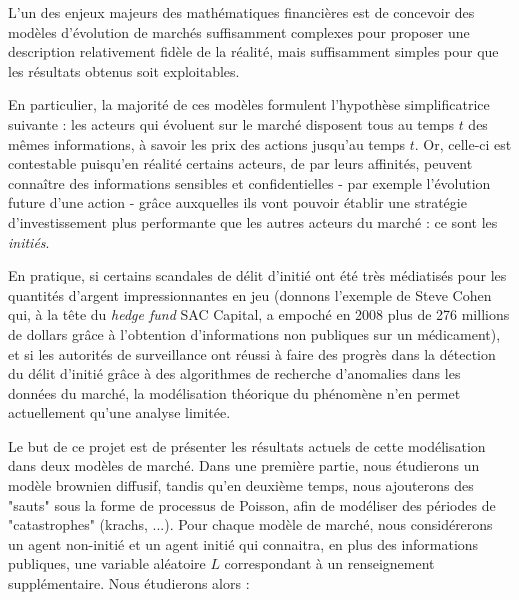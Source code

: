 \documentclass[../finalreport.tex]{subfiles}
\begin{document}
\par L'un des enjeux majeurs des mathématiques financières est de concevoir des modèles d'évolu\-tion de marchés suffisamment complexes pour proposer une description relativement fidèle de la réalité, mais suffisamment simples pour que les résultats obtenus soit exploitables.

\vspace{5mm}

\par En particulier, la majorité de ces modèles formulent l'hypothèse simplificatrice suivante : les acteurs qui évoluent sur le marché disposent tous au temps $t$ des mêmes informations, à savoir les prix des actions jusqu'au temps $t$. Or, celle-ci est contestable puisqu'en réalité certains acteurs, de par leurs affinités, peuvent connaître des informations sensibles et confidentielles - par exemple l'évolution future d'une action - grâce auxquelles ils vont pouvoir établir une stratégie d'investissement plus performante que les autres acteurs du marché : ce sont les \emph{initiés}. 

\vspace{5mm}

\par En pratique, si certains scandales de délit d'initié ont été très médiatisés pour les quantités d'argent impressionnantes en jeu (donnons l'exemple de Steve Cohen qui, à la tête du \emph{hedge fund} SAC Capital, a empoché en 2008 plus de 276 millions de dollars grâce à l'obtention d'informations non publiques sur un médicament), et si les autorités de surveillance ont réussi à faire des progrès dans la détection du délit d'initié grâce à des algorithmes de recherche d'anomalies dans les données du marché, la modélisation théorique du phénomène n'en permet actuellement qu'une analyse limitée.

\vspace{5mm}

\par Le but de ce projet est de présenter les résultats actuels de cette modélisation dans deux modèles de marché. Dans une première partie, nous étudierons un modèle brownien diffusif, tandis qu'en deuxième temps, nous ajouterons des "sauts" sous la forme de processus de Poisson, afin de modéliser des périodes de "catastrophes" (krachs, ...). Pour chaque modèle de marché, nous considére\-rons un agent non-initié et un agent initié qui connaitra, en plus des informations publiques, une variable aléatoire $L$ correspondant à un renseignement supplémentaire. Nous étudierons alors :
\end{document}

